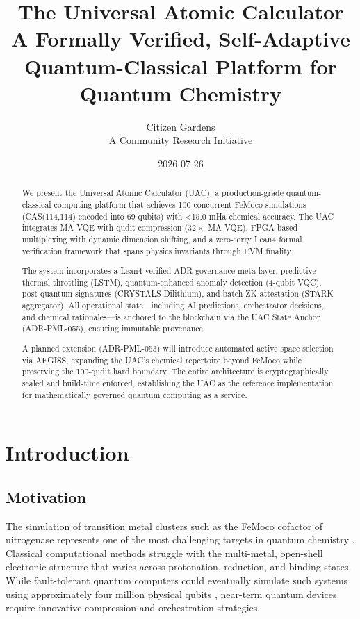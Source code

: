 \documentclass[11pt,a4paper]{article}
\title{The Universal Atomic Calculator\\ A Formally Verified, Self-Adaptive Quantum-Classical Platform for Quantum Chemistry}
\author{Citizen Gardens \\A Community Research Initiative}
\date{2026-07-26}
\begin{document}
\maketitle

\begin{abstract}
We present the Universal Atomic Calculator (UAC), a production-grade quantum-classical computing platform that achieves 100-concurrent FeMoco simulations (CAS(114,114) encoded into 69 qubits) with <15.0 mHa chemical accuracy. The UAC integrates MA-VQE with qudit compression ($32\times$ MA-VQE), FPGA-based multiplexing with dynamic dimension shifting, and a zero-sorry Lean4 formal verification framework that spans physics invariants through EVM finality.

The system incorporates a Lean4-verified ADR governance meta-layer, predictive thermal throttling (LSTM), quantum-enhanced anomaly detection (4-qubit VQC), post-quantum signatures (CRYSTALS-Dilithium), and batch ZK attestation (STARK aggregator). All operational state—including AI predictions, orchestrator decisions, and chemical rationales—is anchored to the blockchain via the UAC State Anchor (ADR-PML-055), ensuring immutable provenance.

A planned extension (ADR-PML-053) will introduce automated active space selection via AEGISS, expanding the UAC's chemical repertoire beyond FeMoco while preserving the 100-qudit hard boundary. The entire architecture is cryptographically sealed and build-time enforced, establishing the UAC as the reference implementation for mathematically governed quantum computing as a service.
\end{abstract}
\newpage
\tableofcontents
\newpage
\section{Introduction}

\subsection{Motivation}
The simulation of transition metal clusters such as the FeMoco cofactor of nitrogenase represents one of the most challenging targets in quantum chemistry \cite{feMocoBenchmark}. Classical computational methods struggle with the multi-metal, open-shell electronic structure that varies across protonation, reduction, and binding states. While fault-tolerant quantum computers could eventually simulate such systems using approximately four million physical qubits \cite{surfaceCodeEstimates}, near-term quantum devices require innovative compression and orchestration strategies.
\end{document}
